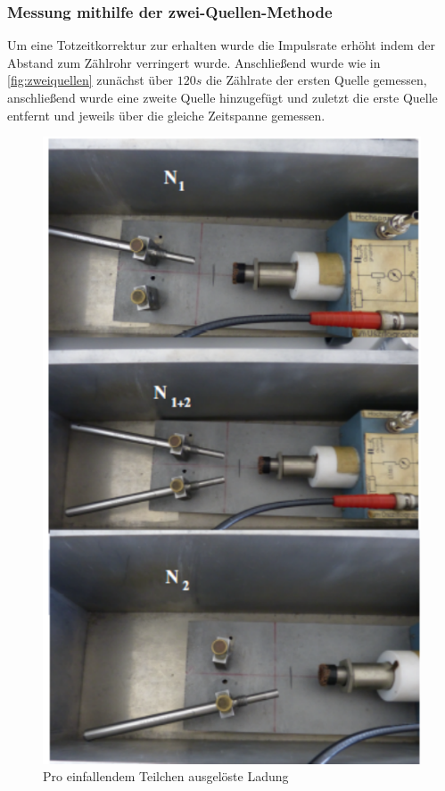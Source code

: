 \subsubsection{Messung mithilfe der zwei-Quellen-Methode}
Um eine Totzeitkorrektur zur erhalten wurde die Impulsrate erhöht indem der Abstand zum Zählrohr verringert 
wurde. Anschließend wurde wie in \autoref{fig:zweiquellen} zunächst über $120s$  die Zählrate der ersten Quelle gemessen, anschließend wurde 
eine zweite Quelle hinzugefügt und zuletzt die erste Quelle entfernt und jeweils über die gleiche Zeitspanne 
gemessen.
\begin{figure}
    \centering
    \includegraphics{Zweiquellenmethode.pdf}
    \caption{Pro einfallendem Teilchen ausgelöste Ladung}
    \label{fig:zweiquellen}
  \end{figure}